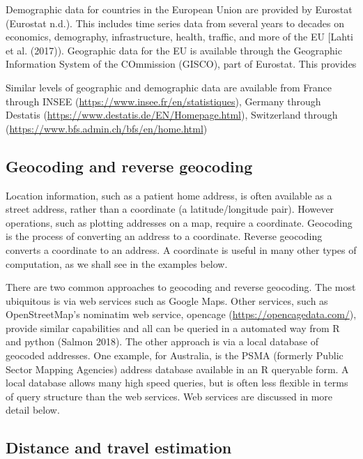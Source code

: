 \documentclass[]{article}
\begin{document}
Demographic data for countries in the European Union are provided by
Eurostat (Eurostat n.d.). This includes time series data from several
years to decades on economics, demography, infrastructure, health,
traffic, and more of the EU {[}Lahti et al. (2017)). Geographic data for
the EU is available through the Geographic Information System of the
COmmission (GISCO), part of Eurostat. This provides

Similar levels of geographic and demographic data are available from
France through INSEE (\url{https://www.insee.fr/en/statistiques}),
Germany through Destatis
(\url{https://www.destatis.de/EN/Homepage.html}), Switzerland through
(\url{https://www.bfs.admin.ch/bfs/en/home.html})

\hypertarget{geocoding-and-reverse-geocoding}{%
\subsection{Geocoding and reverse
geocoding}\label{geocoding-and-reverse-geocoding}}

Location information, such as a patient home address, is often available
as a street address, rather than a coordinate (a latitude/longitude
pair). However operations, such as plotting addresses on a map, require
a coordinate. Geocoding is the process of converting an address to a
coordinate. Reverse geocoding converts a coordinate to an address. A
coordinate is useful in many other types of computation, as we shall see
in the examples below.

There are two common approaches to geocoding and reverse geocoding. The
most ubiquitous is via web services such as Google Maps. Other services,
such as OpenStreetMap's nominatim web service, opencage
(\url{https://opencagedata.com/}), provide similar capabilities and all
can be queried in a automated way from R and python (Salmon 2018). The
other approach is via a local database of geocoded addresses. One
example, for Australia, is the PSMA (formerly Public Sector Mapping
Agencies) address database available in an R queryable form. A local
database allows many high speed queries, but is often less flexible in
terms of query structure than the web services. Web services are
discussed in more detail below.

\hypertarget{distance-and-travel-estimation}{%
\subsection{Distance and travel
estimation}\label{distance-and-travel-estimation}}
\end{document}
